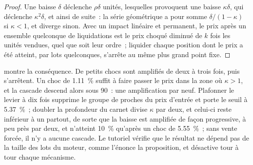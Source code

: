 \begin{proof}
Une baisse $\delta$ déclenche $\rho\delta$ unités, lesquelles provoquent une baisse $\kappa\delta$, qui déclenche $\kappa^2\delta$, et ainsi
de suite~: la série géométrique a pour somme $\delta/(1 - \kappa)$ si $\kappa < 1$, et diverge sinon. Avec un impact linéaire et permanent,
le prix après un ensemble quelconque de liquidations est le prix choqué diminué de $k$ fois les unités vendues, quel que soit leur
ordre~; liquider chaque position dont le prix a été atteint, par lots quelconques, s'arrête au même plus grand point fixe.
\end{proof}

\begin{omfigure}

\label{fig:m3:margin-liquidation-and-loss-allocation:kappa}
\end{omfigure}

 montre la conséquence. De petits chocs sont amplifiés
de deux à trois fois, puis s'arrêtent. Un choc de 1.11~\% suffit à faire passer le prix dans la zone où $\kappa > 1$, et la
cascade descend alors sous 90~: une amplification par neuf. Plafonner le levier à dix fois supprime le groupe de 
proches du prix d'entrée et porte le seuil à 5.37~\%~; doubler la profondeur du carnet divise $\kappa$ par deux, et celui-ci reste inférieur à un
partout, de sorte que la baisse est amplifiée de façon progressive, à peu près par deux, et n'atteint 10~\% qu'après un choc de 5.55~\%~; sans
vente forcée, il n'y a aucune cascade. Le tutoriel vérifie que le résultat ne dépend pas de la taille des
lots du moteur, comme l'énonce la proposition, et désactive tour à tour chaque mécanisme.

